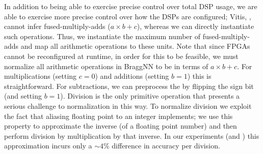 In addition to being able to exercise precise control over total DSP usage, we are able to exercise more precise control over how the DSPs are configured; Vitis, , cannot infer fused-multiply-adds ($a \times b + c$), whereas we can directly instantiate such operations.
Thus, we instantiate the maximum number of fused-multiply-adds and map all arithmetic operations to these units.
Note that since FPGAs cannot be reconfigured at runtime, in order for this to be feasible, we must normalize all arithmetic operations in BraggNN to be in terms of $a \times b + c$.
For multiplications (setting $c = 0$) and additions (setting $b = 1$) this is straightforward.
For subtractions, we can preprocess the  by flipping the sign bit (and setting $b = 1$).
Division is the only primitive operation that presents a serious challenge to normalization in this way.
To normalize division we exploit the fact that aliasing floating point to an integer implements; we use this property to approximate the inverse (of a floating point number) and then perform division by multiplication by that inverse.
In our experiments (and ) this approximation incurs only a $\sim 4\%$ difference in accuracy per division.

